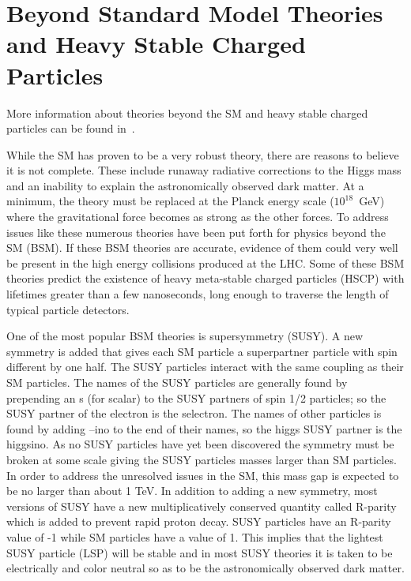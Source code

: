 \section{Beyond Standard Model Theories and Heavy Stable Charged Particles \label{sec:BSM}}
More information about theories beyond the SM and heavy stable charged particles can be found in~\cite{Martin:1997ns, Tata:1997uf, Fairbairn:2006gg}.

While the SM has proven to be a very robust theory, there are reasons to believe it is not complete. These include runaway
radiative corrections to the Higgs mass and an inability to explain the astronomically observed dark matter.
At a minimum, the theory must be replaced at the Planck energy scale ($10^{18}$~GeV)
where the gravitational force becomes as strong as the other forces. To address issues like these numerous
theories have been put forth for physics beyond the SM (BSM). 
If these BSM theories are accurate, evidence of them could very well be present in the high energy collisions produced at the LHC.
Some of these BSM theories predict the existence of heavy meta-stable
charged particles (HSCP) with lifetimes greater than a few nanoseconds, long enough to traverse the length of typical particle detectors. 

One of the most popular BSM theories is supersymmetry (SUSY). A new symmetry is added that gives
each SM particle a superpartner particle with spin different by one half. The SUSY particles interact with the same coupling as their SM particles.
The names of the SUSY particles are generally found by prepending an s (for scalar) to the SUSY partners of spin 1/2 particles;
so the SUSY partner of the electron is the selectron. The names of other particles is found by adding --ino to the end of their names,
so the higgs SUSY partner is the higgsino.
As no SUSY particles have yet been discovered the
symmetry must be broken at some scale giving the SUSY particles masses larger than SM particles. In order to address the unresolved issues in the SM, this mass gap is
expected to be no larger than about 1 TeV. In addition to adding a new symmetry, most versions of SUSY have a new multiplicatively conserved quantity called R-parity
which is added to prevent rapid proton decay.
SUSY particles have an R-parity value of -1 while SM particles have a value of 1. This implies that the lightest SUSY particle (LSP) will be stable and in most
SUSY theories it is taken to be electrically and color neutral so as to be the astronomically observed dark matter.

